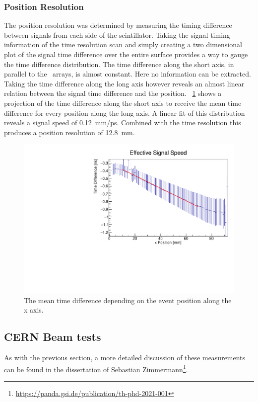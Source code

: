 \documentclass[../BTOF_summary.tex]{subfiles}
\begin{document}
\subsubsection*{Position Resolution}

The position resolution was determined by measuring the timing difference between signals from each side of the scintillator.
Taking the signal timing information of the time resolution scan and simply creating a two dimensional plot of the signal time difference over the entire surface provides a way to gauge the time difference distribution.
The time difference along the short axis, in parallel to the \sipm\ arrays, is almost constant.
Here no information can be extracted.
Taking the time difference along the long axis however reveals an almost linear relation between the signal time difference and the position.
\fig~\ref{fig:positionRes} shows a projection of the time difference along the short axis to receive the mean time difference for every position along the long axis.
A linear fit of this distribution reveals a signal speed of \SI{0.12}{mm/ps}.
Combined with the time resolution this produces a position resolution of \SI{12.8}{mm}.

\begin{figure}[htbp]
    \centering
    \includegraphics[width=.7\textwidth]{fig/run51_EffectiveSpeed.pdf}
    \caption{The mean time difference depending on the event position along the x axis.}
    \label{fig:positionRes}
\end{figure}

\subsection{CERN Beam tests}
\label{sec:CernBeamTest}

As with the previous section, a more detailed discussion of these measurements can be found in the dissertation of Sebastian Zimmermann\footnote{\url{https://panda.gsi.de/publication/th-phd-2021-001}}.
\end{document}
